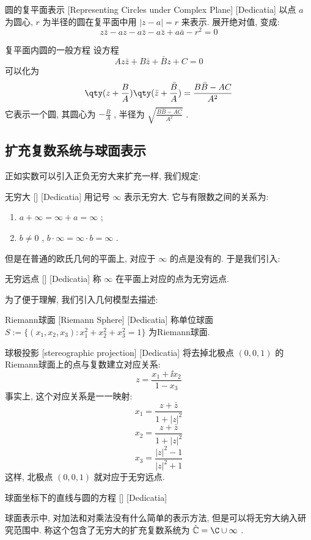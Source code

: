 \documentclass[UTF8]{ctexart}
\begin{document}
\begin{dfn}
    [CircleComplexRepresenting]
    {圆的复平面表示}
    [Representing Circles under Complex Plane]
    [Dedicatia]
    以点 \( a \) 为圆心,  \( r \) 为半径的圆在复平面中用 \( |z-a|=r \) 来表示. 展开绝对值, 变成: 
    \[z\bar{z}-az-a\bar{z}-a\bar{z}+a\bar{a}-r^2=0\]
\end{dfn}
\begin{dfn}
    {复平面内圆的一般方程}
    设方程
    \[Az\bar{z}+B\bar{z}+\bar{B}z+C=0\]
    可以化为
    \[\qty(z+\frac{B}{A})\qty(\bar{z}+\frac{\bar{B}}{A})=\frac{B\bar{B}-AC}{A^2}\]
    它表示一个圆, 其圆心为 \( -\frac{B}{A} \) , 半径为 \( \sqrt{\frac{B\bar{B}-AC}{A^2}} \) .
\end{dfn}
\subsection{扩充复数系统与球面表示}
正如实数可以引入正负无穷大来扩充一样, 我们规定: 
\begin{dfn}
    [UUID]
    {无穷大}
    []
    [Dedicatia]
    用记号 \( \infty \) 表示无穷大. 它与有限数之间的关系为:
    \begin{enumerate}
        \item  \( a+\infty=\infty+a=\infty \) ;
        \item  \( b\neq 0 \) ,  \( b\cdot\infty=\infty\cdot b=\infty \) .
    \end{enumerate}
\end{dfn}
但是在普通的欧氏几何的平面上, 对应于 \( \infty \) 的点是没有的. 于是我们引入: 
\begin{dfn}
    [UUID]
    {无穷远点}
    []
    [Dedicatia]
    称 \( \infty \) 在平面上对应的点为无穷远点. 
\end{dfn}
为了便于理解, 我们引入几何模型去描述: 
\begin{dfn}
    [UUID]
    {Riemann球面}
    [Riemann Sphere]
    [Dedicatia]
    称单位球面 \( S:=\{(x_1,x_2,x_3):x_1^2+x_2^2+x_3^2=1\} \) 为Riemann球面. 
\end{dfn}
\begin{ppt}
    [UUID]
    {球极投影}
    [stereographic projection]
    [Dedicatia]
    将去掉北极点 \( (0,0,1) \) 的Riemann球面上的点与复数建立对应关系: 
    \[z=\frac{x_1+\ii x_2}{1-x_3}\]
    事实上, 这个对应关系是一一映射: 
    \[x_1=\frac{z+\bar{z}}{1+|z|^2}\]
    \[x_2=\frac{z+\bar{z}}{1+|z|^2}\]
    \[x_3=\frac{|z|^2-1}{|z|^2+1}\]
    这样, 北极点 \( (0,0,1) \) 就对应于无穷远点. 
\end{ppt}
\begin{ppt}
    [UUID]
    {球面坐标下的直线与圆的方程}
    []
    [Dedicatia]
\end{ppt}
球面表示中, 对加法和对乘法没有什么简单的表示方法, 但是可以将无穷大纳入研究范围中. 称这个包含了无穷大的扩充复数系统为 \( \hat{\mathbb{C}}=\C\cup\infty  \) .
\end{document}
